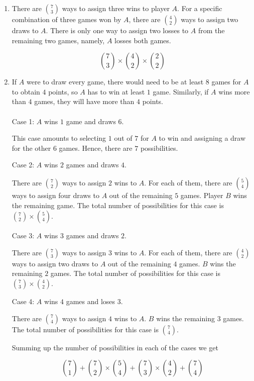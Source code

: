 \begin{enumerate}[label=(\alph*)]
  \item There are ${7 \choose 3}$ ways to assign three wins to player $A$. For a 
  specific combination of three games won by $A$, there are ${4 \choose 2}$ ways 
  to assign two draws to $A$. There is only one way to assign two losses to $A$ 
  from the remaining two games, namely, $A$ losses both games.
  
    $$ {7 \choose 3} \times {4 \choose 2} \times {2 \choose 2} $$
  
  \item   If $A$ were to draw every game, there would need to be at least $8$ 
  games for $A$ to obtain $4$ points, so $A$ has to win at least $1$ game. 
  Similarly, if $A$ wins more than $4$ games, they will have more than $4$ points.\\
    \\
    Case 1: $A$ wins $1$ game and draws $6$.
    
    This case amounts to selecting $1$ out of $7$ for $A$ to win and assigning a 
    draw for the other $6$ games. Hence, there are $7$ possibilities.
      
    Case 2: $A$ wins $2$ games and draws $4$.
    
    There are ${7 \choose 2}$ ways to assign $2$ wins to $A$. For each of them, 
    there are ${5 \choose 4}$ ways to assign four draws to $A$ out of the 
    remaining $5$ games. Player $B$ wins the remaining game. The total number 
    of possibilities for this case is ${7 \choose 2} \times {5 \choose 4}$.
    
    Case 3: $A$ wins $3$ games and draws $2$.
    
    There are ${7 \choose 3}$ ways to assign $3$ wins to $A$. For each of them, 
    there are ${4 \choose 2}$ ways to assign two draws to $A$ out of the remaining 
    $4$ games. $B$ wins the remaining $2$ games. The total number of possibilities 
    for this case is ${7 \choose 3} \times {4 \choose 2}$.
    
    Case 4: $A$ wins $4$ games and loses $3$.
    
    There are ${7 \choose 4}$ ways to assign $4$ wins to $A$. $B$ wins the 
    remaining $3$ games.
    The total number of possibilities for this case is ${7 \choose 4}$.
    
    Summing up the number of possibilities in each of the cases we get
    
    $$ {7 \choose 1} + {7 \choose 2} \times {5 \choose 4} + {7 \choose 3} \times 
    {4 \choose 2} + {7 \choose 4} $$
  

\end{enumerate}
